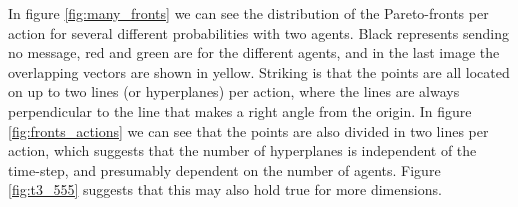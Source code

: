 \documentclass{article}
\begin{document}
\begin{multicols}{2}
	In figure \ref{fig:many_fronts} we can see the distribution of the
	Pareto-fronts per action for several different probabilities with two
	agents. Black represents sending no message, red and green are for the
	different agents, and in the last image the overlapping vectors are shown in
	yellow. Striking is that the points are all located on up to two lines (or
	hyperplanes) per action, where the lines are always perpendicular to the
	line that makes a right angle from the origin. In figure
	\ref{fig:fronts_actions} we can see that the points are also divided in two
	lines per action, which suggests that the number of hyperplanes is
	independent of the time-step, and presumably dependent on the number of
	agents. Figure \ref{fig:t3_555} suggests that this may also hold true for
	more dimensions.
	\end{multicols}
\end{document}
